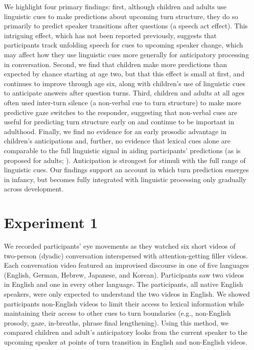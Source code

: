 \documentclass[authoryear, 12pt]{elsarticle}
\begin{document}
We highlight four primary findings: first, although children and adults use linguistic cues to make predictions about upcoming turn structure, they do so primarily to predict speaker transitions after questions (a speech act effect). This intriguing effect, which has not been reported previously, suggests that participants track unfolding speech for cues to upcoming speaker change, which may affect how they use linguistic cues more generally for anticipatory processing in conversation. Second, we find that children make more predictions than expected by chance starting at age two, but that this effect is small at first, and continues to improve through age six, along with children's use of linguistic cues to anticipate answers after question turns. Third, children and adults at all ages often used inter-turn silence (a non-verbal cue to turn structure) to make more predictive gaze switches to the responder, suggesting that non-verbal cues are useful for predicting turn structure early on and continue to be important in adulthood. Finally, we find no evidence for an early prosodic advantage in children's anticipations and, further, no evidence that lexical cues alone are comparable to the full linguistic signal in aiding participants' predictions (as is proposed for adults; \citealp{de-ruiter2006}). Anticipation is strongest for stimuli with the full range of linguistic cues. Our findings support an account in which turn prediction emerges in infancy, but becomes fully integrated with linguistic processing only gradually across development.

\section*{Experiment 1}
\label{sec:exp1}

We recorded participants' eye movements as they watched six short videos of two-person (dyadic) conversation interspersed with attention-getting filler videos. Each conversation video featured an improvised discourse in one of five languages (English, German, Hebrew, Japanese, and Korean). Participants saw two videos in English and one in every other language. The participants, all native English speakers, were only expected to understand the two videos in English. We showed participants non-English videos to limit their access to lexical information while maintaining their access to other cues to turn boundaries (e.g., non-English prosody, gaze, in-breaths, phrase final lengthening). Using this method, we compared children and adult's anticipatory looks from the current speaker to the upcoming speaker at points of turn transition in English and non-English videos.
\end{document}
